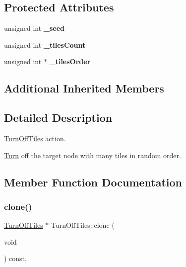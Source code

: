 \subsection*{Protected Attributes}
\begin{DoxyCompactItemize}
\item 
\mbox{\label{classTurnOffTiles_a708bc9ffc87fd1caf600857c45156640}} 
unsigned int {\bfseries \+\_\+seed}
\item 
\mbox{\label{classTurnOffTiles_aa10076b0b89c201e6529bd36162193b1}} 
unsigned int {\bfseries \+\_\+tiles\+Count}
\item 
\mbox{\label{classTurnOffTiles_a34f6e4181a52a31d306350c155c4bd10}} 
unsigned int $\ast$ {\bfseries \+\_\+tiles\+Order}
\end{DoxyCompactItemize}
\subsection*{Additional Inherited Members}


\subsection{Detailed Description}
\hyperlink{classTurnOffTiles}{Turn\+Off\+Tiles} action. 

\hyperlink{classTurn}{Turn} off the target node with many tiles in random order. 

\subsection{Member Function Documentation}
\mbox{\label{classTurnOffTiles_a8387f89056e2ec088e64d49d1701b2dc}} 
\subsubsection{\texorpdfstring{clone()}{clone()}\hspace{0.1cm}{\footnotesize\ttfamily [1/2]}}
{\footnotesize\ttfamily \hyperlink{classTurnOffTiles}{Turn\+Off\+Tiles} $\ast$ Turn\+Off\+Tiles\+::clone (\begin{DoxyParamCaption}\item[{void}]{ }\end{DoxyParamCaption}) const\hspace{0.3cm}{\ttfamily [override]}, {\ttfamily [virtual]}}

